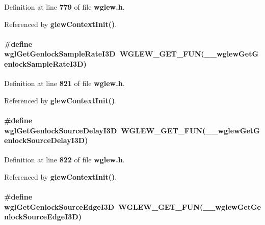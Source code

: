 Definition at line {\bf 779} of file {\bf wglew.\+h}.



Referenced by {\bf glew\+Context\+Init()}.

\paragraph[{wgl\+Get\+Genlock\+Sample\+Rate\+I3D}]{\setlength{\rightskip}{0pt plus 5cm}\#define wgl\+Get\+Genlock\+Sample\+Rate\+I3D~{\bf W\+G\+L\+E\+W\+\_\+\+G\+E\+T\+\_\+\+F\+UN}({\bf \+\_\+\+\_\+wglew\+Get\+Genlock\+Sample\+Rate\+I3D})}\label{wglew_8h_ae7492be94a27cd042f70e57005bada39}


Definition at line {\bf 821} of file {\bf wglew.\+h}.



Referenced by {\bf glew\+Context\+Init()}.

\paragraph[{wgl\+Get\+Genlock\+Source\+Delay\+I3D}]{\setlength{\rightskip}{0pt plus 5cm}\#define wgl\+Get\+Genlock\+Source\+Delay\+I3D~{\bf W\+G\+L\+E\+W\+\_\+\+G\+E\+T\+\_\+\+F\+UN}({\bf \+\_\+\+\_\+wglew\+Get\+Genlock\+Source\+Delay\+I3D})}\label{wglew_8h_a2a03ab43f8b9a6356a2ac04876fe316e}


Definition at line {\bf 822} of file {\bf wglew.\+h}.



Referenced by {\bf glew\+Context\+Init()}.

\paragraph[{wgl\+Get\+Genlock\+Source\+Edge\+I3D}]{\setlength{\rightskip}{0pt plus 5cm}\#define wgl\+Get\+Genlock\+Source\+Edge\+I3D~{\bf W\+G\+L\+E\+W\+\_\+\+G\+E\+T\+\_\+\+F\+UN}({\bf \+\_\+\+\_\+wglew\+Get\+Genlock\+Source\+Edge\+I3D})}\label{wglew_8h_a65233422e95a02e58be44828761c32c9}


